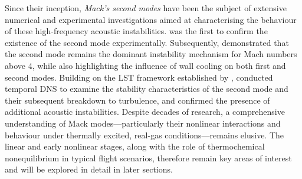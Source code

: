     

Since their inception, \textit{Mack’s second modes} have been the subject of extensive numerical and experimental investigations aimed at characterising the behaviour of these high-frequency acoustic instabilities. \citet{Kendall1975} was the first to confirm the existence of the second mode experimentally. Subsequently, \citet{Lysenko1984} demonstrated that the second mode remains the dominant instability mechanism for Mach numbers above 4, while also highlighting the influence of wall cooling on both first and second modes. Building on the \gls{LST} framework established by \citet{Mack1963}, \citet{Erlebacher1990} conducted temporal \gls{DNS} to examine the stability characteristics of the second mode and their subsequent breakdown to turbulence, and confirmed the presence of additional acoustic instabilities. Despite decades of research, a comprehensive understanding of Mack modes—particularly their nonlinear interactions and behaviour under thermally excited, real-gas conditions—remains elusive. The linear and early nonlinear stages, along with the role of thermochemical nonequilibrium in typical flight scenarios, therefore remain key areas of interest and will be explored in detail in later sections.





